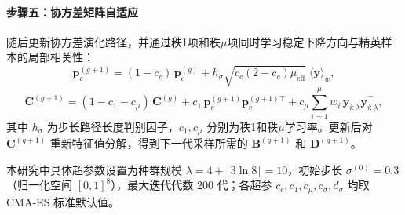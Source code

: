 \paragraph{步骤五：协方差矩阵自适应}
随后更新协方差演化路径，并通过秩1项和秩$\mu$项同时学习稳定下降方向与精英样本的局部相关性：
\begin{equation}
\mathbf{p}_c^{(g+1)} = (1-c_c)\,\mathbf{p}_c^{(g)} + h_\sigma\sqrt{c_c(2-c_c)\mu_\text{eff}}\;\langle\mathbf{y}\rangle_w,
\end{equation}
\begin{equation}
\mathbf{C}^{(g+1)} = (1-c_1-c_\mu)\,\mathbf{C}^{(g)}
  + c_1\,\mathbf{p}_c^{(g+1)}\mathbf{p}_c^{(g+1)\top}
  + c_\mu\sum_{i=1}^{\mu}w_i\,\mathbf{y}_{i:\lambda}\mathbf{y}_{i:\lambda}^{\top},
\end{equation}
其中 $h_\sigma$ 为步长路径长度判别因子，$c_1,c_\mu$ 分别为秩1和秩$\mu$学习率。更新后对 $\mathbf{C}^{(g+1)}$ 重新特征值分解，得到下一代采样所需的 $\mathbf{B}^{(g+1)}$ 和 $\mathbf{D}^{(g+1)}$。

本研究中具体超参数设置为种群规模 $\lambda = 4 + \lfloor 3\ln 8\rfloor = 10$，初始步长 $\sigma^{(0)} = 0.3$（归一化空间 $[0,1]^8$），最大迭代代数 200 代；各超参 $c_c,c_1,c_\mu,c_\sigma,d_\sigma$ 均取 CMA-ES 标准默认值。

